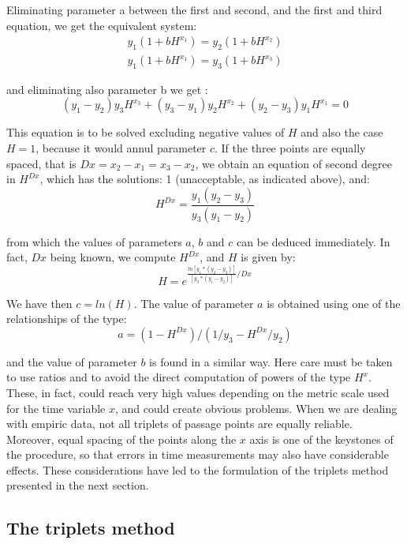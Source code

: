 \documentclass[%
 aip,
 jmp,%
 amsmath,amssymb,
 reprint,%
]{revtex4-1}
\begin{document}
Eliminating parameter a between the first and second, and the first and third equation, we get the equivalent system:
\begin{eqnarray}
y_1 (1 + b H^{x_1}) = y_2 (1 + b H^{x_2}) \\
y_1 (1 + b H^{x_1}) = y_3 (1 + b H^{x_3})
\end{eqnarray}

and eliminating also parameter b we get :
	\[(y_1 - y_2) y_3 H^{x_3} + (y_3 - y_1) y_2 H^{x_2} + (y_2 - y_3) y_1 H^{x_1} = 0\]

This equation is to be solved excluding negative values of $H$ and also the case $H = 1$, because it would annul parameter $c$.
If the three points are equally spaced, that is $Dx = x_2 - x_1 = x_3 - x_2$, we obtain  an  equation  of  second degree  in $H^{Dx}$, which has the solutions: 1 (unacceptable, as indicated above), and:
	\[H^{Dx} = \frac{y_1 (y_2 - y_3)}{y_3 (y_1 - y_2)} \]

from which the values of parameters $a$, $b$ and $c$ can be deduced immediately. In fact, $Dx$ being known, we compute $H^{Dx}$, and $H$ is given by:
	\[H = e^{\frac{ln[y_1 * (y_2 - y_3)]}{[ y_3 * (y_1 - y_2)]} / Dx}\]

We have then $c = ln(H)$. The value of parameter $a$ is obtained using one of the relationships of the type:
	\[a = (1 - H^{Dx}) / (1 / y_3 - H^{Dx} / y_2)\]

and the value of parameter $b$ is found in a similar way.
Here care must  be  taken  to  use  ratios  and to avoid the direct computation of powers of the type $H^x$. These, in fact, could reach very high values depending on the metric scale used for the time variable $x$, and could create obvious problems.
When we are  dealing with  empiric data, not all triplets of passage points are equally reliable. Moreover, equal spacing of the points along the $x$ axis is one of the keystones of the procedure, so that errors in time measurements may also have considerable effects.
These considerations have led to the formulation of the triplets method presented in the next section.


\subsection{\label{sec:level2}The triplets method}
\end{document}
